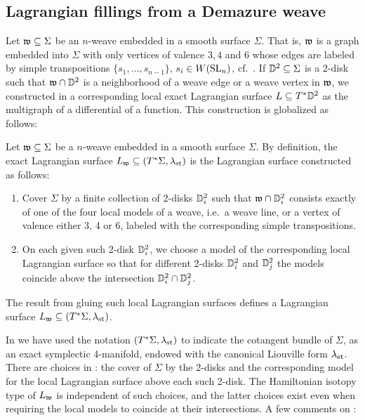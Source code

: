\subsection{Lagrangian fillings from a Demazure weave}\label{ssec:Lagrangian_filling_from_weave} Let $\mathfrak{w}\subseteq\Sigma$ be an $n$-weave embedded in a smooth surface $\Sigma$. That is, $\mathfrak{w}$ is a graph embedded into $\Sigma$ with only vertices of valence $3,4$ and $6$ whose edges are labeled by simple transpositions $\{s_1,\ldots,s_{n-1}\}$, $s_i\in W(\operatorname{SL}_n)$, cf.~\cite[Section 2.3]{CasalsZaslow}. If $\mathbb{D}^2\subseteq\Sigma$ is a 2-disk such that $\mathfrak{w}\cap\mathbb{D}^2$ is a neighborhood of a weave edge or a weave vertex in $\mathfrak{w}$, we constructed in  a corresponding local exact Lagrangian surface $L\subseteq T^*\mathbb{D}^2$ as the multigraph of a differential of a function. This construction is globalized as follows:

\begin{fdef}\label{def:Lagrangian_from_weave} Let $\mathfrak{w}\subseteq\Sigma$ be a $n$-weave embedded in a smooth surface $\Sigma$. By definition, the exact Lagrangian surface $L_{\mathfrak{w}}\subseteq (T^*\Sigma,\lambda_{\text{st}})$ is the Lagrangian surface constructed as follows:

\begin{enumerate}
    \item Cover $\Sigma$ by a finite collection of 2-disks $\mathbb{D}^2_i$ such that $\mathfrak{w}\cap\mathbb{D}^2_i$ consists exactly of one of the four local models of a weave, i.e.~a weave line, or a vertex of valence either 3, 4 or 6, labeled with the corresponding simple transpositions.\\

    \item On each given such 2-disk $\mathbb{D}^2_i$, we choose a model of the corresponding local Lagrangian surface so that for different 2-disks $\mathbb{D}^2_i$ and $\mathbb{D}^2_j$ the models coincide above the intersection $\mathbb{D}^2_i\cap\mathbb{D}^2_j$.
\end{enumerate}
The result from gluing such local Lagrangian surfaces defines a Lagrangian surface $L_{\mathfrak{w}}\subseteq (T^*\Sigma,\lambda_{\text{st}})$.\sbs
\end{fdef}
\vspace{0.2cm}
\noindent In  we have used the notation $(T^*\Sigma,\lambda_{\text{st}})$ to indicate the cotangent bundle of $\Sigma$, as an exact symplectic 4-manifold, endowed with the canonical Liouville form $\lambda_{\text{st}}$. There are choices in : the cover of $\Sigma$ by the 2-disks and the corresponding model for the local Lagrangian surface above each such 2-disk. The Hamiltonian isotopy type of $L_{\mathfrak{w}}$ is independent of such choices, and the latter choices exist even when requiring the local models to coincide at their intersections. A few comments on :

